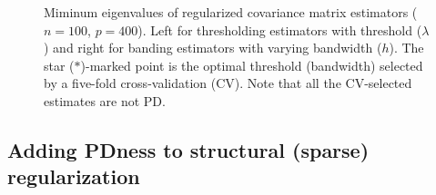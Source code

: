 \documentclass[times,sort&compress,3p]{elsarticle}
\begin{document}
\begin{figure}[htb!]
\begin{minipage}{.45\textwidth}
\end{minipage}
\caption{Miminum eigenvalues of regularized covariance matrix estimators
 ($n=100$, $p=400$). Left for thresholding estimators with threshold ($\lambda$) and
  right for banding estimators with varying bandwidth ($h$). The star ($*$)-marked point is
   the optimal threshold (bandwidth) selected by a five-fold cross-validation (CV). Note that all the
   CV-selected estimates are not PD.}
\label{figure:thresbanding}
\end{figure}



\subsection{Adding PDness to structural (sparse) regularization}\label{subsec:optPD}
\end{document}
